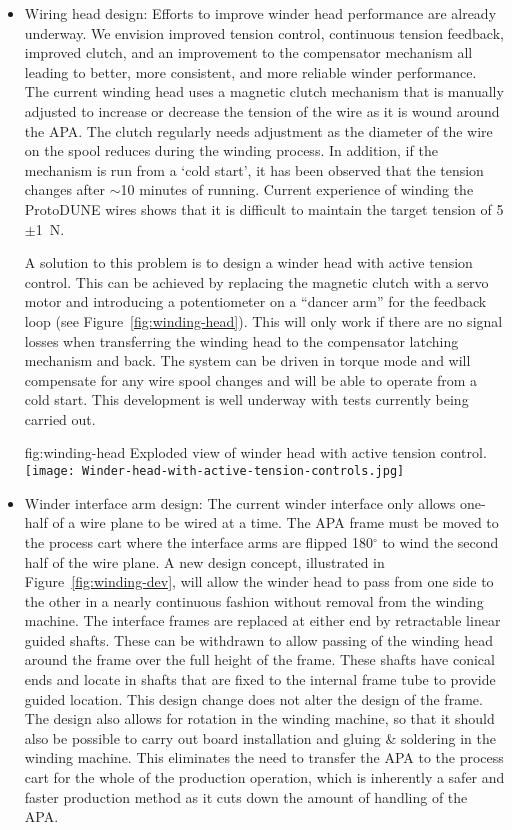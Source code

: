 \begin{itemize}

\item Wiring head design: Efforts to improve winder head performance are already underway. We envision improved tension control, continuous tension feedback, improved clutch, and an improvement to the compensator mechanism all leading to better, more consistent, and more reliable winder performance.  The current winding head uses a magnetic clutch mechanism that is manually adjusted to increase or decrease the tension of the wire as it is wound around the APA. The clutch regularly needs adjustment as the diameter of the wire on the spool reduces during the winding process. In addition, if the mechanism is run from a `cold start', it has been observed that the tension changes after $\sim$10 minutes of running. Current experience of winding the ProtoDUNE wires shows that it is difficult to maintain the target tension of 5$\pm$\SI{1}{N}.

A solution to this problem is to design a winder head with active tension control. This can be achieved by replacing the magnetic clutch with a servo motor and introducing a potentiometer on a ``dancer arm'' for the feedback loop (see Figure~\ref{fig:winding-head}). This will only work if there are no signal losses when transferring the winding head to the compensator latching mechanism and back. The system can be driven in torque mode and will compensate for any wire spool changes and will be able to operate from a cold start. This development is well underway with tests currently being carried out.

\begin{dunefigure}{fig:winding-head}
{Exploded view of winder head with active tension control.}
\texttt{[image: Winder-head-with-active-tension-controls.jpg]}
\end{dunefigure}

\item Winder interface arm design: The current winder interface only allows one-half of a wire plane to be wired at a time. The APA frame must be moved to the process cart where the interface arms are flipped 180$^\circ$ to wind the second half of the wire plane.  A new design concept, illustrated in Figure~\ref{fig:winding-dev}, will allow the winder head to pass from one side to the other in a nearly continuous fashion without removal from the winding machine.  The interface frames are replaced at either end by retractable linear guided shafts. These can be withdrawn to allow passing of the winding head around the frame over the full height of the frame. These shafts have conical ends and locate in shafts that are fixed to the internal frame tube to provide guided location. This design change does not alter the design of the frame. The design also allows for rotation in the winding machine, so that it should also be possible to carry out board installation and gluing \& soldering in the winding machine. This eliminates the need to transfer the APA to the process cart for the whole of the production operation, which is inherently a safer and faster production method as it cuts down the amount of handling of the APA.


\end{itemize}
